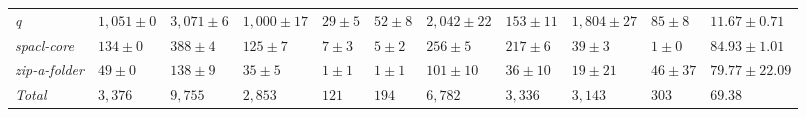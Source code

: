 \begin{table}
{\begin{tabular}[t]{lllllllllll}
\textit{q} & $1,051 \pm 0$ & $3,071 \pm 6$ & $1,000 \pm 17$ & $29 \pm 5$ & $52 \pm 8$ & $2,042 \pm 22$ & $153 \pm 11$ & $1,804 \pm 27$ & $85 \pm 8$ & $11.67 \pm 0.71$\\
\textit{spacl-core} & $134 \pm 0$ & $388 \pm 4$ & $125 \pm 7$ & $7 \pm 3$ & $5 \pm 2$ & $256 \pm 5$ & $217 \pm 6$ & $39 \pm 3$ & $1 \pm 0$ & $84.93 \pm 1.01$\\
\textit{zip-a-folder} & $49 \pm 0$ & $138 \pm 9$ & $35 \pm 5$ & $1 \pm 1$ & $1 \pm 1$ & $101 \pm 10$ & $36 \pm 10$ & $19 \pm 21$ & $46 \pm 37$ & $79.77 \pm 22.09$\\
\hline\textit{Total} & $3,376$ & $9,755$ & $2,853$ & $121$ & $194$ & $6,782$ & $3,336$ & $3,143$ & $303$ & $69.38$\\
\bottomrule
\end{tabular}}
\end{table}
